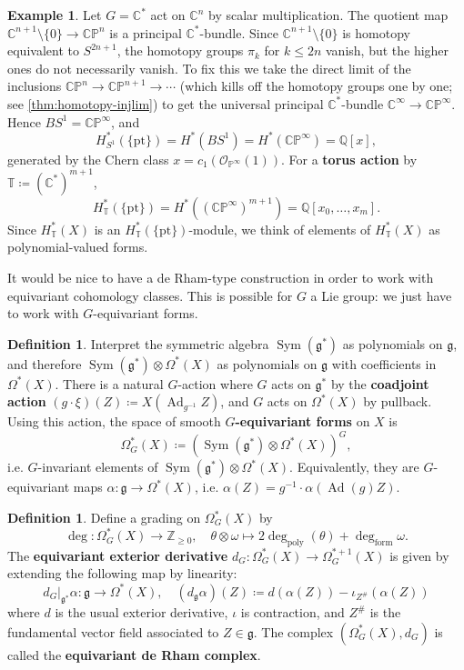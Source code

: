 \documentclass{report}
\theoremstyle{plain}
\theoremstyle{definition}
\newtheorem{definition}[theorem]{Definition}
\newtheorem{example}[theorem]{Example}
\theoremstyle{remark}
\newcommand{\bC}{\mathbb{C}}
\newcommand{\bT}{\mathbb{T}}
\newcommand{\bQ}{\mathbb{Q}}
\newcommand{\bP}{\mathbb{P}}
\newcommand{\bZ}{\mathbb{Z}}
\newcommand{\cO}{\mathcal{O}}
\newcommand{\fg}{\mathfrak{g}}
\DeclareMathOperator{\Sym}{Sym}
\DeclareMathOperator{\Ad}{Ad}
\newcommand{\pt}{\mathrm{pt}}
\begin{document}
\begin{example} \label{ex:eqcoh-torus}
  Let $G = \bC^*$ act on $\bC^n$ by scalar multiplication. The
  quotient map $\bC^{n+1} \setminus \{0\} \to \bC\bP^n$ is a principal
  $\bC^*$-bundle. Since $\bC^{n+1} \setminus \{0\}$ is homotopy
  equivalent to $S^{2n+1}$, the homotopy groups $\pi_k$ for $k \le 2n$
  vanish, but the higher ones do not necessarily vanish. To fix this
  we take the direct limit of the inclusions $\bC\bP^n \to
  \bC\bP^{n+1} \to \cdots$ (which kills off the homotopy groups one by
  one; see \ref{thm:homotopy-injlim}) to get the universal principal
  $\bC^*$-bundle $\bC^\infty \to \bC\bP^\infty$. Hence $BS^1 =
  \bC\bP^\infty$, and
  \[ H^*_{S^1}(\{\pt\}) = H^*(BS^1) = H^*(\bC\bP^\infty) = \bQ[x], \]
  generated by the Chern class $x = c_1(\cO_{\bP^\infty}(1))$. For a
  {\bf torus action} by $\bT \coloneqq (\bC^*)^{m+1}$,
  \[ H^*_{\bT}(\{\pt\}) = H^*((\bC\bP^\infty)^{m+1}) = \bQ[x_0, \ldots, x_m]. \]
  Since $H^*_{\bT}(X)$ is an $H^*_{\bT}(\{\pt\})$-module, we think of
  elements of $H^*_{\bT}(X)$ as polynomial-valued forms.
\end{example}

It would be nice to have a de Rham-type construction in order to work
with equivariant cohomology classes. This is possible for $G$ a Lie
group: we just have to work with $G$-equivariant forms.

\begin{definition}
  Interpret the symmetric algebra $\Sym(\fg^*)$ as polynomials on
  $\fg$, and therefore $\Sym(\fg^*) \otimes \Omega^*(X)$ as
  polynomials on $\fg$ with coefficients in $\Omega^*(X)$. There is a
  natural $G$-action where $G$ acts on $\fg^*$ by the {\bf coadjoint
    action} $(g \cdot \xi)(Z) \coloneqq X(\Ad_{g^{-1}}Z)$, and $G$
  acts on $\Omega^*(X)$ by pullback. Using this action, the space of
  smooth {\bf $G$-equivariant forms} on $X$ is
  \[ \Omega^*_G(X) \coloneqq (\Sym(\fg^*) \otimes \Omega^*(X))^G, \]
  i.e. $G$-invariant elements of $\Sym(\fg^*) \otimes \Omega^*(X)$.
  Equivalently, they are $G$-equivariant maps $\alpha\colon \fg \to
  \Omega^*(X)$, i.e. $\alpha(Z) = g^{-1}\cdot\alpha(\Ad(g)Z)$.
\end{definition}

\begin{definition}
  Define a grading on $\Omega^*_G(X)$ by
  \[ \deg\colon \Omega^*_G(X) \to \bZ_{\ge 0}, \quad \theta \otimes \omega \mapsto 2\deg_{\text{poly}}(\theta) + \deg_{\text{form}}\omega. \]
  The {\bf equivariant exterior derivative} $d_G\colon \Omega^*_G(X)
  \to \Omega^{*+1}_G(X)$ is given by extending the following map by
  linearity:
  \[ d_G|_{\fg^*}\alpha\colon \fg \to \Omega^*(X), \quad (d_{\fg}\alpha)(Z) \coloneqq d(\alpha(Z)) - \iota_{Z^\#}(\alpha(Z)) \]
  where $d$ is the usual exterior derivative, $\iota$ is contraction,
  and $Z^\#$ is the fundamental vector field associated to $Z \in
  \fg$. The complex $(\Omega^*_G(X), d_G)$ is called the {\bf
    equivariant de Rham complex}.
\end{definition}
\end{document}
